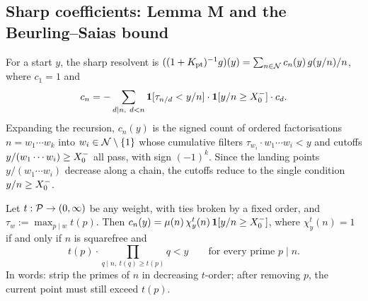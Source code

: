 %
\subsection{Sharp coefficients: Lemma M and the Beurling--Saias bound}\label{sec:noise-saias}

For a start $y$, the sharp resolvent is $((1+K_{\mathrm{pt}})^{-1}g)(y)=\sum_{n\in\mathcal{N}}c_n(y)\,g(y/n)/n$, where $c_1=1$ and
\[
  c_n=-\sum_{d\mid n,\ d<n}\mathbf 1[\tau_{n/d}<y/n]\cdot\mathbf 1[y/n\ge X_0^{-}]\cdot c_d .
\]
Expanding the recursion, $c_n(y)$ is the signed count of ordered factorisations $n=w_1\cdots w_k$ into
$w_i\in\mathcal{N}\setminus\{1\}$ whose cumulative filters $\tau_{w_i}\cdot w_1\cdots w_i<y$ and cutoffs
$y/(w_1\cdots w_i)\ge X_0^{-}$ all pass, with sign $(-1)^k$. Since the landing points $y/(w_1\cdots w_i)$ decrease along a
chain, the cutoffs reduce to the single condition $y/n\ge X_0^{-}$.

\begin{lemma}[Lemma M]\label{lem:lemmaM}
Let $t:\mathcal{P}\to(0,\infty)$ be any weight, with ties broken by a fixed order, and $\tau_w:=\max_{p\mid w}t(p)$. Then
$c_n(y)=\mu(n)\,\chi^t_y(n)\,\mathbf 1[y/n\ge X_0^{-}]$, where $\chi^t_y(n)=1$ if and only if $n$ is squarefree and
\[
  t(p)\cdot\prod_{q\mid n,\ t(q)\ge t(p)}q<y\qquad\text{for every prime }p\mid n .
\]
In words: strip the primes of $n$ in decreasing $t$-order; after removing $p$, the current point must still exceed $t(p)$.
\end{lemma}

